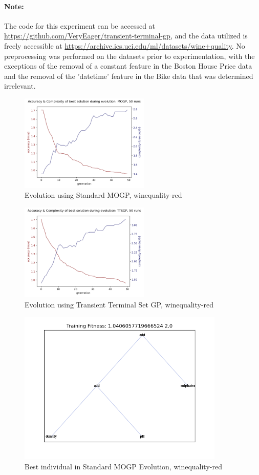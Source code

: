 \documentclass[a4paper]{article}
\begin{document}
\paragraph{Note:} The code for this experiment can be accessed at \url{https://github.com/VeryEager/transient-terminal-gp}, and the data utilized is freely accessible at \url{https://archive.ics.uci.edu/ml/datasets/wine+quality}. No preprocessing was performed on the datasets prior to experimentation, with the exceptions of the removal of a constant feature in the Boston House Price data and the removal of the 'datetime' feature in the Bike data that was determined irrelevant. 
\begin{figure}[H]
	\caption{Evolution using Standard MOGP, winequality-red}
	\centering
	\includegraphics[width=0.55\textwidth]{winequality-red-evo-MOGP}
\end{figure}
\begin{figure}[H]
	\caption{Evolution using Transient Terminal Set GP, winequality-red}
	\centering
	\includegraphics[width=0.55\textwidth]{winequality-red-evo-TTSGP}
\end{figure}
\begin{figure}[H]
	\caption{Best individual in Standard MOGP Evolution, winequality-red}
	\centering
	\includegraphics[width=0.875\textwidth]{winequality-red-MOGP-ex}
\end{figure}
\end{document}
